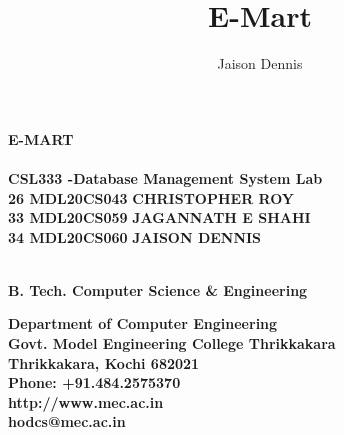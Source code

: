 \documentclass[11pt]{report}
\begin{document}
\renewcommand\bibname{References}
\pagestyle{fancy}
\fancyfoot{}
\fancyfoot[c]{\thepage}
\renewcommand{\chaptermark}[1]{
\markboth{\thechapter.\ #1}{}} 
\renewcommand{\headrulewidth}{0.1pt}
\fancyhead[r]{\slshape \leftmark}
\addtolength{\headheight}{\baselineskip}

\lhead{\nouppercase{\rightmark}}
\rhead{\nouppercase{\leftmark}}
%
\title {E-Mart}
\author {Jaison Dennis}

\begin{titlepage}
\begin{center}

\Huge{\textbf{E-MART}}\\
\large{\textbf{\\CSL333  -Database Management System Lab\\}}
\vspace{1.2in}
\Large{\textbf{26
		MDL20CS043
}}	\hspace{.1in}	\Large{\textbf{CHRISTOPHER ROY}}\\
\Large{\textbf{33
		MDL20CS059
}}	\hspace{.1in}	\Large{\textbf{JAGANNATH E SHAHI}}\\ 
\Large{\textbf{34
		MDL20CS060
}}	\hspace{.1in}	\Large{\textbf{JAISON DENNIS}}\\ 
	\hspace{.1in}	

\Large{\textbf{
\\B. Tech. Computer Science \& Engineering
}}


\vspace{.6in}
\begin{figure}[h]
\begin{center}
\end{center}
\end{figure}
\textbf{
Department of Computer Engineering\\
Govt. Model Engineering College Thrikkakara\\
Thrikkakara, Kochi 682021\\
Phone: +91.484.2575370\\
http://www.mec.ac.in \\
hodcs@mec.ac.in
}
\end{center}
\end{titlepage}
\end{document}

